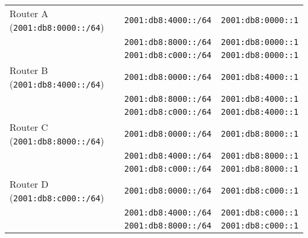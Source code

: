 \begin{enumerate}
\begin{longtable}{@{}lll@{}}
        Router A (\texttt{2001:db8:0000::/64}) & \texttt{2001:db8:4000::/64} & \texttt{2001:db8:0000::1} \\
                                               & \texttt{2001:db8:8000::/64} & \texttt{2001:db8:0000::1} \\
                                               & \texttt{2001:db8:c000::/64} & \texttt{2001:db8:0000::1} \\
        \addlinespace
        Router B (\texttt{2001:db8:4000::/64}) & \texttt{2001:db8:0000::/64} & \texttt{2001:db8:4000::1} \\
                                               & \texttt{2001:db8:8000::/64} & \texttt{2001:db8:4000::1} \\
                                               & \texttt{2001:db8:c000::/64} & \texttt{2001:db8:4000::1} \\
        \addlinespace
        Router C (\texttt{2001:db8:8000::/64}) & \texttt{2001:db8:0000::/64} & \texttt{2001:db8:8000::1} \\
                                               & \texttt{2001:db8:4000::/64} & \texttt{2001:db8:8000::1} \\
                                               & \texttt{2001:db8:c000::/64} & \texttt{2001:db8:8000::1} \\
        \addlinespace
        Router D (\texttt{2001:db8:c000::/64}) & \texttt{2001:db8:0000::/64} & \texttt{2001:db8:c000::1} \\
                                               & \texttt{2001:db8:4000::/64} & \texttt{2001:db8:c000::1} \\
                                               & \texttt{2001:db8:8000::/64} & \texttt{2001:db8:c000::1} \\
        \bottomrule
        \end{longtable}


\end{enumerate}
